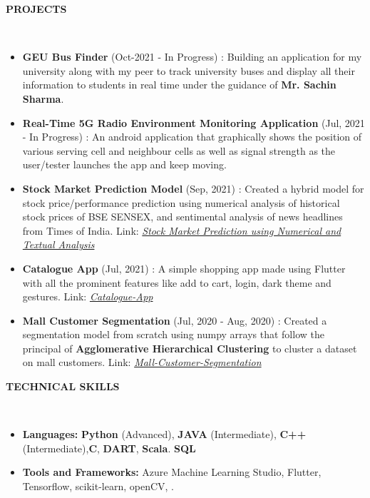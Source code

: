 \documentclass[a4paper,10pt]{article}
\newcommand{\lsep}{-0.5cm}
\newcommand{\resheading}[1]{{\small \colorbox{mygrey}{\begin{minipage}{0.975\textwidth}{\textbf{#1 \vphantom{p\^{E}}}}\end{minipage}}}}
\begin{document}
\resheading{\textbf{PROJECTS} }\\[\lsep]
\begin{itemize}
\setlength\itemsep{0.5em}

\item \textbf{GEU Bus Finder} (Oct-2021 - In Progress) : Building an application for my university along with my peer to track university buses and display all their information to students in real time under the guidance of \textbf{Mr. Sachin Sharma}.

\item \textbf{Real-Time 5G Radio Environment Monitoring Application} (Jul, 2021 - In Progress) : An android application that graphically shows the position of various serving cell and neighbour cells as well as signal strength as the user/tester launches the app and keep moving.

\item \textbf{Stock Market Prediction Model} (Sep, 2021) : Created a hybrid model for stock price/performance prediction using numerical analysis of historical stock prices of BSE SENSEX, and sentimental analysis of news headlines from Times of India. Link: \href{https://github.com/Ash20vyas/TSF-Intern-Tasks/tree/main/%232%20-%20Stock%20Market%20Prediction%20using%20Numerical%20and%20Textual%20Analysis} {\textit{Stock Market Prediction using Numerical and Textual Analysis}}

\item \textbf{Catalogue App} (Jul, 2021) : A simple shopping app made using Flutter with all the prominent features like add to cart, login, dark theme and gestures. Link: \href{https://github.com/Ash20vyas/catalogue_app} {\textit{Catalogue-App}}

\item \textbf{Mall Customer Segmentation} (Jul, 2020 - Aug, 2020) : Created a segmentation model from scratch using numpy arrays that follow the principal of \textbf{Agglomerative Hierarchical Clustering} to cluster a dataset on mall customers. Link: \href{https://github.com/Ash20vyas/Mall-Customer-Segmentation} {\textit{Mall-Customer-Segmentation}}

\end{itemize}

\resheading{\textbf{TECHNICAL SKILLS} }\\[\lsep]
\begin{itemize}
\setlength\itemsep{0em}
\item \noindent \textbf{Languages:} \textbf{Python} (Advanced), \textbf{JAVA} (Intermediate), \textbf{C++} (Intermediate),\textbf{C},  \textbf{DART}, \textbf{Scala}. \textbf{SQL} \\
\item \noindent\textbf{Tools and Frameworks:} Azure Machine Learning Studio, Flutter, Tensorflow, scikit-learn, openCV, .\\
\end{itemize}
\end{document}
